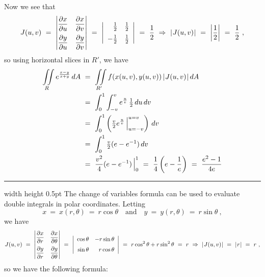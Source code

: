 \begin{exmp}
 Now we see that
 \begin{displaymath}
  J(u,v) ~=~
   \begin{vmatrix}
    \dfrac{\partial x}{\partial u} & \dfrac{\partial x}{\partial v}\vspace{2mm}\\
    \dfrac{\partial y}{\partial u} & \dfrac{\partial y}{\partial v}
   \end{vmatrix} ~=~
   \left| \begin{array}{rr}
    \tfrac{1}{2} & \tfrac{1}{2}\vspace{2mm}\\
    -\tfrac{1}{2} & \tfrac{1}{2}
   \end{array}\right| ~=~ \frac{1}{2} ~\Rightarrow~ \abs{J(u,v)} ~=~ \left| \frac{1}{2} \right| ~=~ \frac{1}{2} ~,
 \end{displaymath}
 so using horizontal slices in $R'$, we have
 \begin{align*}
  \iint\limits_{R} e^{\frac{x-y}{x+y}} \,dA ~&=~ \iint\limits_{R'} f(x(u,v),y(u,v))\,\lvert\mspace{1mu}J(u,v)\mspace{1mu}\rvert\,dA\\
  &=~ \int_0^1 \int_{-v}^v e^{\frac{u}{v}} \, \tfrac{1}{2}\,du\,dv\\
  &=~ \int_0^1 \left( \tfrac{v}{2} e^{\frac{u}{v}} \,\Big|_{u=-v}^{u=v} \right) \,dv\\
  &=~ \int_0^1 \tfrac{v}{2} (e - e^{-1})\,dv\\
  &=~ \frac{v^2}{4} (e - e^{-1}) \,\Big|_{0}^{1} ~=~ \frac{1}{4} \left( e - \frac{1}{e} \right) ~=~ \frac{e^2 - 1}{4e}
 \end{align*}
\end{exmp}
\hrule width \textwidth height 0.5pt
\newpage
The change of variables formula can be used to evaluate double integrals in polar coordinates. Letting
\begin{displaymath}
 x ~=~ x(r,\theta) ~=~ r\cos \theta \quad \text{and} \quad y ~=~ y(r,\theta) ~=~ r\sin \theta ~,
\end{displaymath}
we have
\begin{displaymath}
 J(u,v) ~=~
  \begin{vmatrix}
   \dfrac{\partial x}{\partial r} & \dfrac{\partial x}{\partial \theta}\vspace{2mm}\\
   \dfrac{\partial y}{\partial r} & \dfrac{\partial y}{\partial \theta}
  \end{vmatrix} ~=~
  \left| \begin{array}{rr}
   \cos \theta & -r\sin \theta\vspace{2mm}\\
   \sin \theta & r\cos \theta
  \end{array}\right| ~=~ r\cos^2 \theta + r\sin^2 \theta ~=~ r ~\Rightarrow~ \abs{J(u,v)} ~=~ \abs{r} ~=~ r ~,
\end{displaymath}
so we have the following formula:

